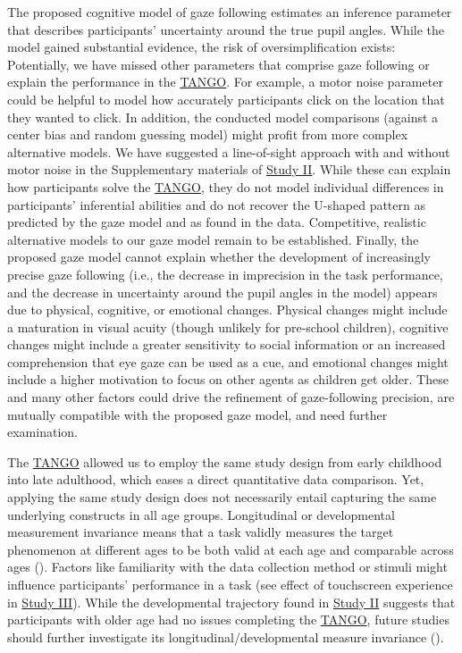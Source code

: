 \documentclass[
]{scrbook}
\begin{document}
The proposed cognitive model of gaze following estimates an inference parameter that describes participants' uncertainty around the true pupil angles. While the model gained substantial evidence, the risk of oversimplification exists: Potentially, we have missed other parameters that comprise gaze following or explain the performance in the \hyperref[acronyms_TANGO]{TANGO}. For example, a motor noise parameter could be helpful to model how accurately participants click on the location that they wanted to click. In addition, the conducted model comparisons (against a center bias and random guessing model) might profit from more complex alternative models. We have suggested a line-of-sight approach with and without motor noise in the Supplementary materials of \hyperref[studyII]{Study II}. While these can explain how participants solve the \hyperref[acronyms_TANGO]{TANGO}, they do not model individual differences in participants' inferential abilities and do not recover the U-shaped pattern as predicted by the gaze model and as found in the data. Competitive, realistic alternative models to our gaze model remain to be established. Finally, the proposed gaze model cannot explain whether the development of increasingly precise gaze following (i.e., the decrease in imprecision in the task performance, and the decrease in uncertainty around the pupil angles in the model) appears due to physical, cognitive, or emotional changes. Physical changes might include a maturation in visual acuity (though unlikely for pre-school children), cognitive changes might include a greater sensitivity to social information or an increased comprehension that eye gaze can be used as a cue, and emotional changes might include a higher motivation to focus on other agents as children get older. These and many other factors could drive the refinement of gaze-following precision, are mutually compatible with the proposed gaze model, and need further examination.

The \hyperref[acronyms_TANGO]{TANGO} allowed us to employ the same study design from early childhood into late adulthood, which eases a direct quantitative data comparison. Yet, applying the same study design does not necessarily entail capturing the same underlying constructs in all age groups. Longitudinal or developmental measurement invariance means that a task validly measures the target phenomenon at different ages to be both valid at each age and comparable across ages (). Factors like familiarity with the data collection method or stimuli might influence participants' performance in a task (see effect of touchscreen experience in \hyperref[studyIII]{Study III}). While the developmental trajectory found in \hyperref[studyII]{Study II} suggests that participants with older age had no issues completing the \hyperref[acronyms_TANGO]{TANGO}, future studies should further investigate its longitudinal/developmental measure invariance ().
\end{document}

